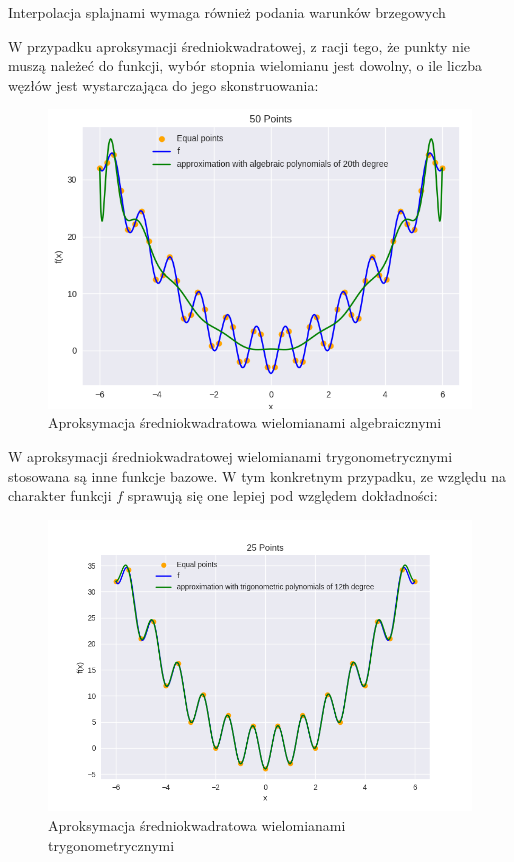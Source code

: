 \documentclass{article}
\begin{document}
Interpolacja splajnami wymaga również podania warunków brzegowych

W przypadku aproksymacji średniokwadratowej, z racji tego, że punkty nie muszą należeć do funkcji, wybór stopnia wielomianu
jest dowolny, o ile liczba węzłów jest wystarczająca do jego skonstruowania:

\begin{figure}[H]
    \centering
    \includegraphics[width=\textwidth]{img/algpoly_20_50.png}
    \caption{Aproksymacja średniokwadratowa wielomianami algebraicznymi}
\end{figure}

W aproksymacji średniokwadratowej wielomianami trygonometrycznymi stosowana są inne funkcje bazowe.
W tym konkretnym przypadku, ze względu na charakter funkcji $f$ sprawują się one lepiej pod względem dokładności:

\begin{figure}[H]
    \centering
    \includegraphics[width=\textwidth]{img/tripoly_12_25.png}
    \caption{Aproksymacja średniokwadratowa wielomianami trygonometrycznymi}
\end{figure}
\end{document}
